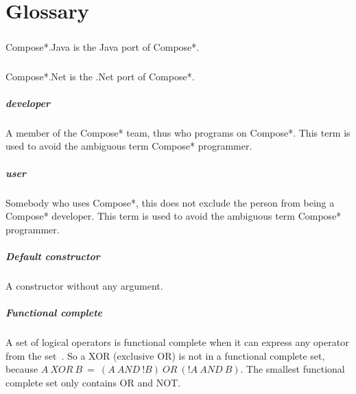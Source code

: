 \chapter{Glossary}
\paragraph{\Compose*[Java]} Compose*.Java is the Java port of Compose*.
\paragraph{\Compose*[DotNET]} Compose*.Net is the .Net port of Compose*.
\paragraph{\Compose*{} developer} A member of the Compose* team, thus who programs on Compose*.
This term is used to avoid the ambiguous term Compose* programmer.
\paragraph{\Compose*{} user} Somebody who uses Compose*, this does not exclude the
person from being a Compose* developer. This term is used to avoid the ambiguous term Compose* programmer.
\paragraph{Default constructor} A constructor without any argument.

\paragraph{Functional complete} A set of logical operators is functional complete when it can express any operator from
the set~\cite{vanBenthem91}.
So a XOR (exclusive OR) is not in a functional complete set, because 
$A~XOR~B~=~(A~AND~!B)~OR~(!A~AND~B)$. The smallest
functional complete set only contains OR and NOT.

